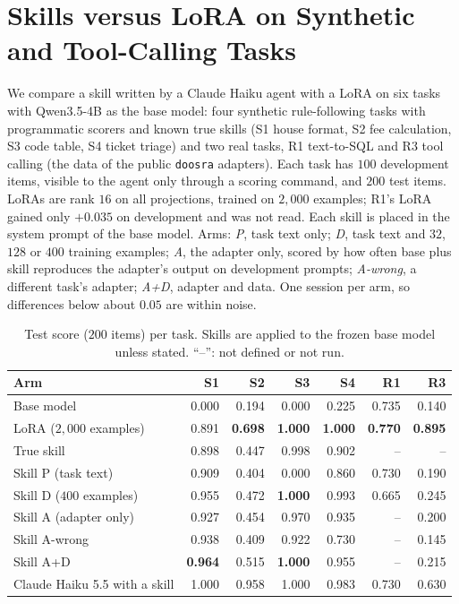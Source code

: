 \documentclass[11pt]{article}
\newcommand{\best}[1]{\textbf{#1}}
\begin{document}
\section{Skills versus LoRA on Synthetic and Tool-Calling Tasks}
\label{app:fresh}

We compare a skill written by a Claude Haiku agent with a LoRA on six tasks with Qwen3.5-4B as the base model: four synthetic rule-following tasks with
programmatic scorers and known true skills (S1 house format, S2 fee calculation, S3 code table, S4 ticket triage) and two real tasks, R1 text-to-SQL and
R3 tool calling (the data of the public \texttt{doosra} adapters). Each task has $100$ development items, visible to the agent only through a scoring
command, and $200$ test items. LoRAs are rank $16$ on all projections, trained on $2{,}000$ examples; R1's LoRA gained only $+0.035$ on development and
was not read. Each skill is placed in the system prompt of the base model. Arms: \emph{P}, task text only; \emph{D}, task text and $32$, $128$ or $400$
training examples; \emph{A}, the adapter only, scored by how often base plus skill reproduces the adapter's output on development prompts;
\emph{A-wrong}, a different task's adapter; \emph{A+D}, adapter and data. One session per arm, so differences below about $0.05$ are within noise.

\begin{table}[h]
\centering
\caption{Test score ($200$ items) per task. Skills are applied to the frozen base model unless stated. ``--'': not defined or not run.}
\label{tab:fresh-main}
\small
\begin{tabular}{@{}l*{6}{r}@{}}
\toprule
Arm & S1 & S2 & S3 & S4 & R1 & R3\\
\midrule
Base model & 0.000 & 0.194 & 0.000 & 0.225 & 0.735 & 0.140\\
LoRA ($2{,}000$ examples) & 0.891 & \best{0.698} & \best{1.000} & \best{1.000} & \best{0.770} & \best{0.895}\\
True skill & 0.898 & 0.447 & 0.998 & 0.902 & -- & --\\
\midrule
Skill P (task text) & 0.909 & 0.404 & 0.000 & 0.860 & 0.730 & 0.190\\
Skill D ($400$ examples) & 0.955 & 0.472 & \best{1.000} & 0.993 & 0.665 & 0.245\\
Skill A (adapter only) & 0.927 & 0.454 & 0.970 & 0.935 & -- & 0.200\\
Skill A-wrong & 0.938 & 0.409 & 0.922 & 0.730 & -- & 0.145\\
Skill A+D & \best{0.964} & 0.515 & \best{1.000} & 0.955 & -- & 0.215\\
\midrule
Claude Haiku 5.5 with a skill & 1.000 & 0.958 & 1.000 & 0.983 & 0.730 & 0.630\\
\bottomrule
\end{tabular}
\end{table}
\end{document}
